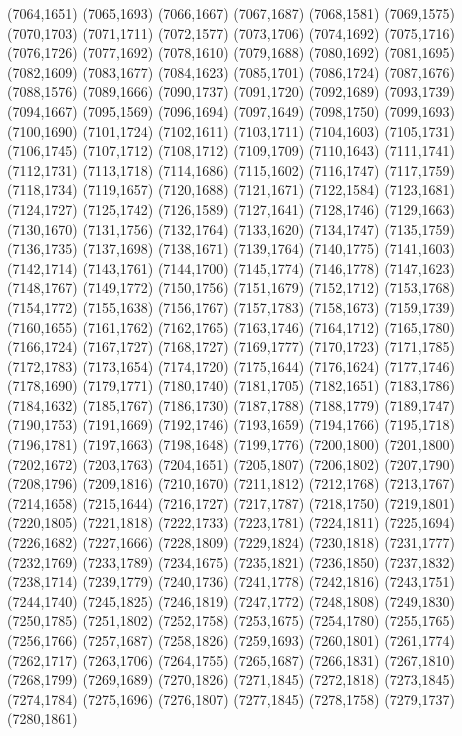 (7064,1651)
(7065,1693)
(7066,1667)
(7067,1687)
(7068,1581)
(7069,1575)
(7070,1703)
(7071,1711)
(7072,1577)
(7073,1706)
(7074,1692)
(7075,1716)
(7076,1726)
(7077,1692)
(7078,1610)
(7079,1688)
(7080,1692)
(7081,1695)
(7082,1609)
(7083,1677)
(7084,1623)
(7085,1701)
(7086,1724)
(7087,1676)
(7088,1576)
(7089,1666)
(7090,1737)
(7091,1720)
(7092,1689)
(7093,1739)
(7094,1667)
(7095,1569)
(7096,1694)
(7097,1649)
(7098,1750)
(7099,1693)
(7100,1690)
(7101,1724)
(7102,1611)
(7103,1711)
(7104,1603)
(7105,1731)
(7106,1745)
(7107,1712)
(7108,1712)
(7109,1709)
(7110,1643)
(7111,1741)
(7112,1731)
(7113,1718)
(7114,1686)
(7115,1602)
(7116,1747)
(7117,1759)
(7118,1734)
(7119,1657)
(7120,1688)
(7121,1671)
(7122,1584)
(7123,1681)
(7124,1727)
(7125,1742)
(7126,1589)
(7127,1641)
(7128,1746)
(7129,1663)
(7130,1670)
(7131,1756)
(7132,1764)
(7133,1620)
(7134,1747)
(7135,1759)
(7136,1735)
(7137,1698)
(7138,1671)
(7139,1764)
(7140,1775)
(7141,1603)
(7142,1714)
(7143,1761)
(7144,1700)
(7145,1774)
(7146,1778)
(7147,1623)
(7148,1767)
(7149,1772)
(7150,1756)
(7151,1679)
(7152,1712)
(7153,1768)
(7154,1772)
(7155,1638)
(7156,1767)
(7157,1783)
(7158,1673)
(7159,1739)
(7160,1655)
(7161,1762)
(7162,1765)
(7163,1746)
(7164,1712)
(7165,1780)
(7166,1724)
(7167,1727)
(7168,1727)
(7169,1777)
(7170,1723)
(7171,1785)
(7172,1783)
(7173,1654)
(7174,1720)
(7175,1644)
(7176,1624)
(7177,1746)
(7178,1690)
(7179,1771)
(7180,1740)
(7181,1705)
(7182,1651)
(7183,1786)
(7184,1632)
(7185,1767)
(7186,1730)
(7187,1788)
(7188,1779)
(7189,1747)
(7190,1753)
(7191,1669)
(7192,1746)
(7193,1659)
(7194,1766)
(7195,1718)
(7196,1781)
(7197,1663)
(7198,1648)
(7199,1776)
(7200,1800)
(7201,1800)
(7202,1672)
(7203,1763)
(7204,1651)
(7205,1807)
(7206,1802)
(7207,1790)
(7208,1796)
(7209,1816)
(7210,1670)
(7211,1812)
(7212,1768)
(7213,1767)
(7214,1658)
(7215,1644)
(7216,1727)
(7217,1787)
(7218,1750)
(7219,1801)
(7220,1805)
(7221,1818)
(7222,1733)
(7223,1781)
(7224,1811)
(7225,1694)
(7226,1682)
(7227,1666)
(7228,1809)
(7229,1824)
(7230,1818)
(7231,1777)
(7232,1769)
(7233,1789)
(7234,1675)
(7235,1821)
(7236,1850)
(7237,1832)
(7238,1714)
(7239,1779)
(7240,1736)
(7241,1778)
(7242,1816)
(7243,1751)
(7244,1740)
(7245,1825)
(7246,1819)
(7247,1772)
(7248,1808)
(7249,1830)
(7250,1785)
(7251,1802)
(7252,1758)
(7253,1675)
(7254,1780)
(7255,1765)
(7256,1766)
(7257,1687)
(7258,1826)
(7259,1693)
(7260,1801)
(7261,1774)
(7262,1717)
(7263,1706)
(7264,1755)
(7265,1687)
(7266,1831)
(7267,1810)
(7268,1799)
(7269,1689)
(7270,1826)
(7271,1845)
(7272,1818)
(7273,1845)
(7274,1784)
(7275,1696)
(7276,1807)
(7277,1845)
(7278,1758)
(7279,1737)
(7280,1861)
